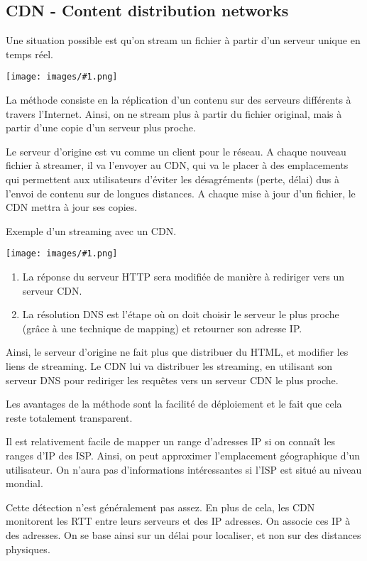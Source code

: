 \documentclass[10pt,a4paper]{report}
\newcommand{\dessin}[1]{\begin{center}\texttt{[image: images/\#1.png]}\end{center}}
\newcommand{\dessinS}[2]{\begin{center}\texttt{[image: images/\#1.png]}\end{center}}
\begin{document}
		\subsection{CDN - Content distribution networks}
		
		Une situation possible est qu'on stream un fichier à partir d'un serveur unique en temps réel.
			
		\dessin{84}
			
		La méthode consiste en la réplication d'un contenu sur des serveurs différents à travers l'Internet. Ainsi, on ne stream plus à partir du fichier original, mais à partir d'une copie d'un serveur plus proche.
			
		Le serveur d'origine est vu comme un client pour le réseau. A chaque nouveau fichier à streamer, il va l'envoyer au CDN, qui va le placer à des emplacements qui permettent aux utilisateurs d'éviter les désagréments (perte, délai) dus à l'envoi de contenu sur de longues distances. A chaque mise à jour d'un fichier, le CDN mettra à jour ses copies.
			
			Exemple d'un streaming avec un CDN.
			
			\dessinS{85}{.8}
			
			\begin{enumerate}
				\item La réponse du serveur HTTP sera modifiée de manière à rediriger vers un serveur CDN.
				\item La résolution DNS est l'étape où	on doit choisir le serveur le plus proche (grâce à une technique de mapping) et retourner son adresse IP. 
			\end{enumerate}
			
			Ainsi, le serveur d'origine ne fait plus que distribuer du HTML, et modifier les liens de streaming. Le CDN lui va distribuer les streaming, en utilisant son serveur DNS pour rediriger les requêtes vers un serveur CDN le plus proche.
			
			Les avantages de la méthode sont la facilité de déploiement et le fait que cela reste totalement transparent.
			
			Il est relativement facile de mapper un range d'adresses IP si on connaît les ranges d'IP des ISP. Ainsi, on peut approximer l'emplacement géographique d'un utilisateur. On n'aura pas d'informations intéressantes si l'ISP est situé au niveau mondial.
			
			Cette détection n'est généralement pas assez. En plus de cela, les CDN monitorent les RTT entre leurs serveurs et des IP adresses. On associe ces IP à des adresses. On se base ainsi sur un délai pour localiser, et non sur des distances physiques.
			
\end{document}
